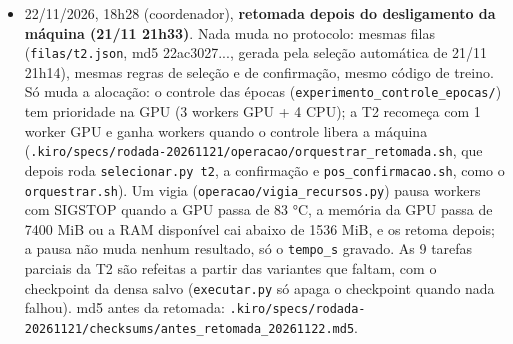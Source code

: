\documentclass[11pt,a4paper]{article}
\begin{document}
\begin{itemize}
\item 22/11/2026, 18h28 (coordenador), \textbf{retomada depois do desligamento da máquina (21/11 21h33)}. Nada muda no protocolo: mesmas filas (\texttt{filas/\allowbreak{}t2.\allowbreak{}json}, md5 22ac3027..., gerada pela seleção automática de 21/11 21h14), mesmas regras de seleção e de confirmação, mesmo código de treino. Só muda a alocação: o controle das épocas (\texttt{experimento\_\allowbreak{}controle\_\allowbreak{}epocas/\allowbreak{}}) tem prioridade na GPU (3 workers GPU + 4 CPU); a T2 recomeça com 1 worker GPU e ganha workers quando o controle libera a máquina (\texttt{.\allowbreak{}kiro/\allowbreak{}specs/\allowbreak{}rodada-\allowbreak{}20261121/\allowbreak{}operacao/\allowbreak{}orquestrar\_\allowbreak{}retomada.\allowbreak{}sh}, que depois roda \texttt{selecionar.\allowbreak{}py t2}, a confirmação e \texttt{pos\_\allowbreak{}confirmacao.\allowbreak{}sh}, como o \texttt{orquestrar.\allowbreak{}sh}). Um vigia (\texttt{operacao/\allowbreak{}vigia\_\allowbreak{}recursos.\allowbreak{}py}) pausa workers com SIGSTOP quando a GPU passa de 83 °C, a memória da GPU passa de 7400 MiB ou a RAM disponível cai abaixo de 1536 MiB, e os retoma depois; a pausa não muda nenhum resultado, só o \texttt{tempo\_\allowbreak{}s} gravado. As 9 tarefas parciais da T2 são refeitas a partir das variantes que faltam, com o checkpoint da densa salvo (\texttt{executar.\allowbreak{}py} só apaga o checkpoint quando nada falhou). md5 antes da retomada: \texttt{.\allowbreak{}kiro/\allowbreak{}specs/\allowbreak{}rodada-\allowbreak{}20261121/\allowbreak{}checksums/\allowbreak{}antes\_\allowbreak{}retomada\_\allowbreak{}20261122.\allowbreak{}md5}.

\end{itemize}
\end{document}
